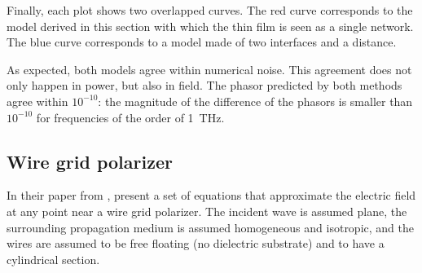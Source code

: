 Finally, each plot shows two overlapped curves.
The red curve corresponds to the model derived in this section with which the thin film is seen as a single network.
The blue curve corresponds to a model made of two interfaces and a distance.

As expected, both models agree within numerical noise.
This agreement does not only happen in power, but also in field.
The phasor predicted by both methods agree within $10^{-10}$: the magnitude of the difference of the phasors is smaller than $10^{-10}$ for frequencies of the order of \SI{1}{\tera\hertz}.  



\subsection{Wire grid polarizer}
In their paper from \citeyear{houde_2001} , \textcite{houde_2001} present a set of equations that approximate the electric field at any point near a wire grid polarizer.
The incident wave is assumed plane, the surrounding propagation medium is assumed homogeneous and isotropic, and the wires are assumed to be free floating (no dielectric substrate) and to have a cylindrical section.

